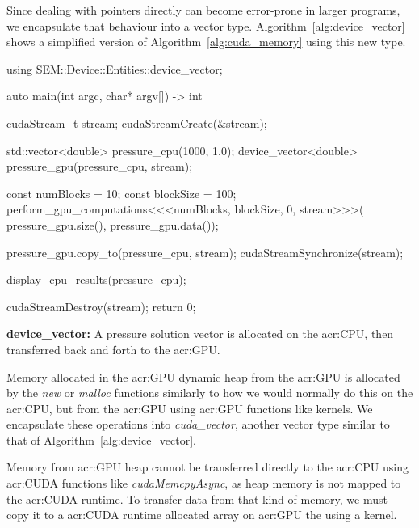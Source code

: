 Since dealing with pointers directly can become error-prone in larger programs, we encapsulate that
behaviour into a vector type. Algorithm~\ref{alg:device_vector} shows a simplified version of
Algorithm~\ref{alg:cuda_memory} using this new type.

\begin{algorithm}[H]
    \begin{cuda}
        using SEM::Device::Entities::device_vector;

        auto main(int argc, char* argv[]) -> int {
            cudaStream_t stream;
            cudaStreamCreate(&stream); 

            std::vector<double> pressure_cpu(1000, 1.0);
            device_vector<double> pressure_gpu(pressure_cpu, stream);

            const numBlocks = 10;
            const blockSize = 100;
            perform_gpu_computations<<<numBlocks, blockSize, 0, stream>>>(
                pressure_gpu.size(), pressure_gpu.data());
            
            pressure_gpu.copy_to(pressure_cpu, stream);
            cudaStreamSynchronize(stream);

            display_cpu_results(pressure_cpu);

            cudaStreamDestroy(stream);
            return 0;
        }\end{cuda}
\caption{\textbf{device\_vector:} A pressure solution vector is allocated on the \acrshort{acr:CPU}, then transferred back and forth to the \acrshort{acr:GPU}.}\label{alg:device_vector}
\end{algorithm}

Memory allocated in the \acrshort{acr:GPU} dynamic heap from the \acrshort{acr:GPU} is allocated by
the \textit{new} or \textit{malloc} functions similarly to how we would normally do this on the
\acrshort{acr:CPU}, but from the \acrshort{acr:GPU} using \acrshort{acr:GPU} functions like kernels.
We encapsulate these operations into \textit{cuda\_vector}, another vector type similar to that of
Algorithm~\ref{alg:device_vector}.

Memory from \acrshort{acr:GPU} heap cannot be transferred directly to the \acrshort{acr:CPU} using
\acrshort{acr:CUDA} functions like \textit{cudaMemcpyAsync}, as heap memory is not mapped to the
\acrshort{acr:CUDA} runtime. To transfer data from that kind of memory, we must copy it to a
\acrshort{acr:CUDA} runtime allocated array on \acrshort{acr:GPU} the using a kernel.

